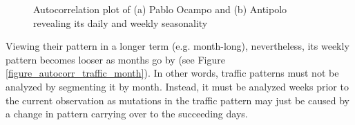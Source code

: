 \begin{figure}[h] 
\centering
    \centering
      \captionsetup{justification=centering}
    \hfill
    \caption{Autocorrelation plot of (a) Pablo Ocampo and (b) Antipolo revealing its daily and weekly seasonality}

    \label{figure_autocorr_week}
\end{figure}



Viewing their pattern in a longer term (e.g. month-long), nevertheless, its weekly pattern becomes looser as months go by (see Figure \ref{figure_autocorr_traffic_month}). In other words, traffic patterns must not be analyzed by segmenting it by month. Instead, it must be analyzed weeks prior to the current observation as mutations in the traffic pattern may just be caused by a change in pattern carrying over to the succeeding days.

